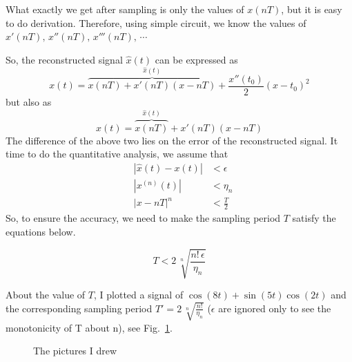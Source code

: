 \documentclass{article}
\begin{document}
What exactly we get after sampling is only the values of $x(nT)$, but it is easy to do derivation. Therefore, using simple circuit, we know the values of $x'(nT),\,x''(nT),\,x'''(nT),\,\cdots$

So, the reconstructed signal $\hat{x}(t)$ can be expressed as
\begin{equation}
	x(t) = \overbrace{x(nT) + x'(nT)(x - nT)}^{\hat{x}(t)} + \frac{x''(t_0)}{2}(x - t_0)^2
\end{equation}
but also as
\begin{equation}
	x(t) = \overbrace{x(nT)}^{\hat{x}(t)} + x'(nT)(x - nT)
\end{equation}
The difference of the above two lies on the error of the reconstructed signal. It time to do the quantitative analysis, we assume that
\begin{equation}
	\begin{aligned}
		&|\hat{x}(t) - x(t)| &< \epsilon \\
		&|x^{(n)}(t)|  &< \eta_n \\ 
		&|x - nT|^n &< \frac{T}{2}
	\end{aligned}
\end{equation}
So, to ensure the accuracy, we need to make the sampling period $T$ satisfy the equations below.

\begin{equation}
	T < 2 \, \sqrt[n]{\frac{n! \,  \epsilon}{\eta_n}}
\end{equation}

About the value of $T$, I plotted a signal of $\cos(8t) + \sin(5t)\cos(2t)$ and the corresponding sampling period $T' = 2 \, \sqrt[n]{\frac{n!}{\eta_n}}$ ($\epsilon$ are ignored only to see the monotonicity of T about n), see Fig.~\ref{fig:maxes}.

\begin{figure}[!h]
	\centering
	\hspace{0 pt}
	\caption{The pictures I drew}
	\label{fig:maxes}
\end{figure}
\end{document}
